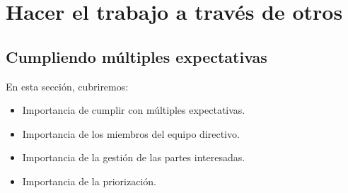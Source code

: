 \documentclass[10pt]{book}
\begin{document}
\chapter{Hacer el trabajo a través de otros}
\section{Cumpliendo múltiples expectativas}
En esta sección, cubriremos:
\begin{itemize}
\item Importancia de cumplir con múltiples expectativas.
\item Importancia de los miembros del equipo directivo. 
\item Importancia de la gestión de las partes interesadas.
\item Importancia de la priorización.
\end{itemize}
\end{document}
